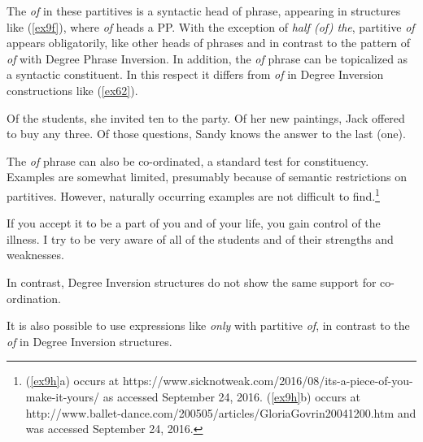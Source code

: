 \documentclass[output=paper,
modfonts
]{LSP/langsci}
\begin{document}
{{{\begin{exe}
\end{exe}
The {\textit{of}} in these partitives is a syntactic head of phrase, appearing in structures like ({\ref{ex9f}}), where {\textit{of}} heads a PP.  With the exception of {\textit{half (of) the}}, partitive {\textit{of}} appears obligatorily, like other heads of phrases and in contrast to the pattern of {\textit{of}} with Degree Phrase Inversion.  In addition, the {\textit{of}} phrase can be topicalized as a syntactic constituent.  In this respect it differs from {\textit{of}} in Degree Inversion constructions like ({\ref{ex62}}).
\begin{exe}
\ex\label{ex9g}
\begin{xlist}
\ex Of the students, she invited ten to the party.
\ex Of her new paintings, Jack offered to buy any three.
\ex Of those questions, Sandy knows the answer to the last (one).
\end{xlist}
\end{exe}
The {\textit{of}} phrase can also be co-ordinated, a standard test for constituency.  Examples are somewhat limited, presumably because of semantic restrictions on partitives.  However, naturally occurring examples are not difficult to find.{\footnote{({\ref{ex9h}}a) occurs at https://www.sicknotweak.com/2016/08/its-a-piece-of-you-make-it-yours/ as accessed September 24, 2016.  ({\ref{ex9h}}b) occurs at http://www.ballet-dance.com/200505/articles/GloriaGovrin20041200.htm and was accessed September 24, 2016.}}

\begin{exe}
\ex\label{ex9h}
\begin{xlist}
\ex If you accept it to be a part of you and of your life, you gain control of the illness.
\ex I try to be very aware of all of the students and of their strengths and weaknesses.
 \end{xlist}
\end{exe}
In contrast, Degree Inversion structures do not show the same support for co-ordination.
\begin{exe}
\ex\label{ex9i}  
\begin{xlist}
\end{xlist}
\end{exe}
It is also possible to use expressions like {\textit{only}} with partitive {\textit{of}}, in contrast to the {\textit{of}} in Degree Inversion structures.
\begin{exe}
\ex\label{ex9j}  
\begin{xlist}
\end{xlist}
\end{exe}

}}}
\end{document}
